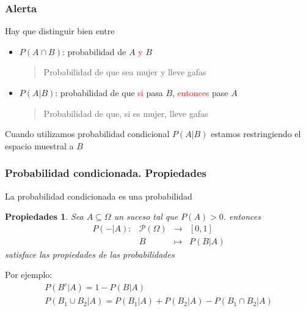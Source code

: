 \documentclass[handout]{beamer}\usepackage[]{graphicx}\usepackage[]{color}
\newcommand{\red}[1]{\textcolor{red}{#1}}
\theoremstyle{plain}
\newtheorem{prop}{Propiedades}
\theoremstyle{definition}
\newcommand{\EM}{\Omega}
\begin{document}
\begin{frame}
\frametitle{Alerta}

Hay que distinguir bien entre
\begin{itemize}
\item $P(A\cap B)$: probabilidad de $A$ \red{y} $B$

\begin{quote}
Probabilidad de que sea mujer y  lleve gafas
\end{quote}
\medskip


\item $P(A|B)$: probabilidad de que \red{si} pasa $B$, \red{entonces} pase $A$

\begin{quote}
Probabilidad de que, si es mujer, lleve gafas
\end{quote}

\end{itemize}
\bigskip

Cuando utilizamos probabilidad condicional  $P(A|B)$ estamos restringiendo el espacio muestral a $B$
\end{frame}
\begin{frame}
\frametitle{Probabilidad condicionada. Propiedades}

La probabilidad condicionada es una probabilidad

\begin{prop}
Sea $A\subseteq \EM$ un suceso tal que $P(A)>0$. entonces
$$
\begin{array}{rccl}
P(-|A):& \mathcal{P}(\EM) & \to & [0,1]\\
&B & \mapsto & P(B|A)
\end{array}
$$
satisface las propiedades de las probabilidades
\end{prop}

Por ejemplo:
$$
\begin{array}{l}
P(B^c|A)=1-P(B|A)\\
P(B_1\cup B_2|A)=P(B_1|A)+P(B_2|A)-P(B_1\cap B_2|A)
\end{array}
$$

\end{frame}

%
%
%
%
%
\end{document}
